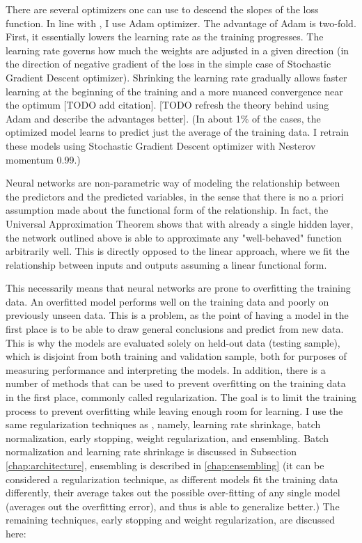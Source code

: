		There are several optimizers one can use to descend the slopes of the loss function. In line with \cite{gu2020empirical}, I use Adam optimizer. The advantage of Adam is two-fold. First, it essentially lowers the learning rate as the training progresses. The learning rate governs how much the weights are adjusted in a given direction (in the direction of negative gradient of the loss in the simple case of Stochastic Gradient Descent optimizer). Shrinking the learning rate gradually allows faster learning at the beginning of the training and a more nuanced convergence near the optimum [TODO add citation]. [TODO refresh the theory behind using Adam and describe the advantages better]. (In about 1\% of the cases, the optimized model learns to predict just the average of the training data. I retrain these models using Stochastic Gradient Descent optimizer with Nesterov momentum 0.99.)
		
		Neural networks are non-parametric way of modeling the relationship between the predictors and the predicted variables, in the sense that there is no a priori assumption made about the functional form of the relationship. In fact, the Universal Approximation Theorem shows that with already a single hidden layer, the network outlined above is able to approximate any "well-behaved" function arbitrarily well. This is directly opposed to the linear approach, where we fit the relationship between inputs and outputs assuming a linear functional form. 
		
		This necessarily means that neural networks are prone to overfitting the training data. An overfitted model performs well on the training data and poorly on previously unseen data. This is a problem, as the point of having a model in the first place is to be able to draw general conclusions and predict from new data. This is why the models are evaluated solely on held-out data (testing sample), which is disjoint from both training and validation sample, both for purposes of measuring performance and interpreting the models. In addition, there is a number of methods that can be used to prevent overfitting on the training data in the first place, commonly called regularization. The goal is to limit the training process to prevent overfitting while leaving enough room for learning. I use the same regularization techniques as \cite{gu2020empirical}, namely, learning rate shrinkage, batch normalization, early stopping, weight regularization, and ensembling. Batch normalization and learning rate shrinkage is discussed in Subsection \ref{chap:architecture}, ensembling is described in \ref{chap:ensembling} (it can be considered a regularization technique, as different models fit the training data differently, their average takes out the possible over-fitting of any single model (averages out the overfitting error), and thus is able to generalize better.) The remaining techniques, early stopping and weight regularization, are discussed here: 
		
